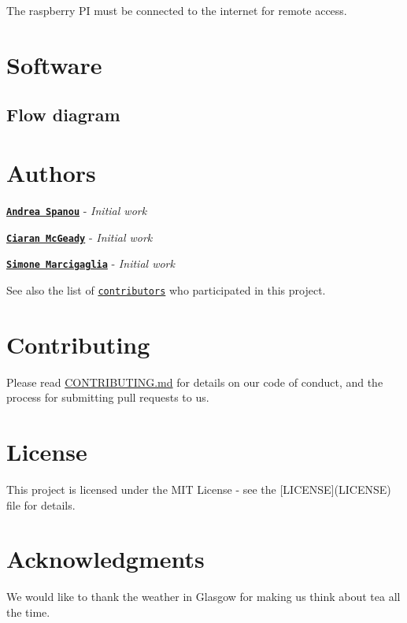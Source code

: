 The raspberry PI must be connected to the internet for remote access.

\section*{Software}

\subsection*{Flow diagram}



\section*{Authors}


\begin{DoxyItemize}
\item \href{https://github.com/andreaspanou}{\tt {\bfseries Andrea Spanou}} -\/ {\itshape Initial work}
\item \href{https://github.com/CiaranAnthony}{\tt {\bfseries Ciaran Mc\+Geady}} -\/ {\itshape Initial work}
\item \href{https://github.com/SimoneMarcigaglia}{\tt {\bfseries Simone Marcigaglia}} -\/ {\itshape Initial work}
\end{DoxyItemize}

See also the list of \href{https://github.com/GlasgowTeam3RTEP/ExcellenTea/contributors}{\tt contributors} who participated in this project.

\section*{Contributing}

Please read \mbox{\hyperlink{md_CONTRIBUTING}{C\+O\+N\+T\+R\+I\+B\+U\+T\+I\+NG.md}} for details on our code of conduct, and the process for submitting pull requests to us.

\section*{License}

This project is licensed under the M\+IT License -\/ see the \mbox{[}L\+I\+C\+E\+N\+SE\mbox{]}(L\+I\+C\+E\+N\+SE) file for details.

\section*{Acknowledgments}

We would like to thank the weather in Glasgow for making us think about tea all the time. 